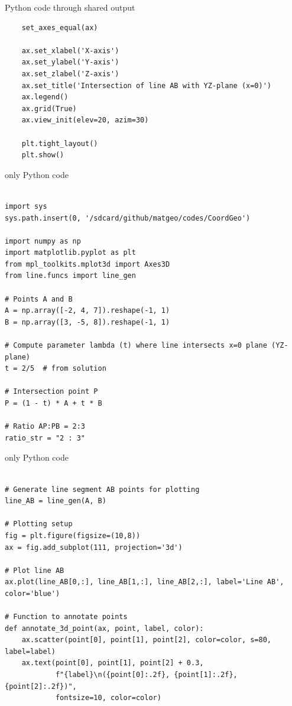 \documentclass{beamer}
\begin{document}
\begin{frame}[fragile]{Python code through shared output}
\begin{lstlisting}
    set_axes_equal(ax)

    ax.set_xlabel('X-axis')
    ax.set_ylabel('Y-axis')
    ax.set_zlabel('Z-axis')
    ax.set_title('Intersection of line AB with YZ-plane (x=0)')
    ax.legend()
    ax.grid(True)
    ax.view_init(elev=20, azim=30)

    plt.tight_layout()
    plt.show()

  \end{lstlisting}
\end{frame}
\begin{frame}[fragile]{only Python code}
\begin{lstlisting}

import sys
sys.path.insert(0, '/sdcard/github/matgeo/codes/CoordGeo')

import numpy as np
import matplotlib.pyplot as plt
from mpl_toolkits.mplot3d import Axes3D
from line.funcs import line_gen

# Points A and B
A = np.array([-2, 4, 7]).reshape(-1, 1)
B = np.array([3, -5, 8]).reshape(-1, 1)

# Compute parameter lambda (t) where line intersects x=0 plane (YZ-plane)
t = 2/5  # from solution

# Intersection point P
P = (1 - t) * A + t * B

# Ratio AP:PB = 2:3
ratio_str = "2 : 3"
 \end{lstlisting}
\end{frame}
\begin{frame}[fragile]{only Python code}
\begin{lstlisting}

# Generate line segment AB points for plotting
line_AB = line_gen(A, B)

# Plotting setup
fig = plt.figure(figsize=(10,8))
ax = fig.add_subplot(111, projection='3d')

# Plot line AB
ax.plot(line_AB[0,:], line_AB[1,:], line_AB[2,:], label='Line AB', color='blue')

# Function to annotate points
def annotate_3d_point(ax, point, label, color):
    ax.scatter(point[0], point[1], point[2], color=color, s=80, label=label)
    ax.text(point[0], point[1], point[2] + 0.3,
            f"{label}\n({point[0]:.2f}, {point[1]:.2f}, {point[2]:.2f})",
            fontsize=10, color=color)
 \end{lstlisting}
\end{frame}
\end{document}
